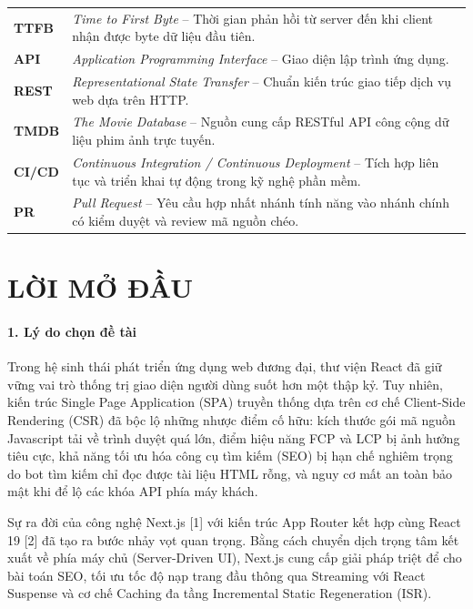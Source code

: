 \documentclass[13pt,a4paper]{extarticle}
\begin{document}
\begin{longtable}{>{\raggedright\arraybackslash}p{3cm}>{\raggedright\arraybackslash}p{12.5cm}}
\textbf{TTFB} & \textit{Time to First Byte} -- Thời gian phản hồi từ server đến khi client nhận được byte dữ liệu đầu tiên. \\
\textbf{API} & \textit{Application Programming Interface} -- Giao diện lập trình ứng dụng. \\
\textbf{REST} & \textit{Representational State Transfer} -- Chuẩn kiến trúc giao tiếp dịch vụ web dựa trên HTTP. \\
\textbf{TMDB} & \textit{The Movie Database} -- Nguồn cung cấp RESTful API công cộng dữ liệu phim ảnh trực tuyến. \\
\textbf{CI/CD} & \textit{Continuous Integration / Continuous Deployment} -- Tích hợp liên tục và triển khai tự động trong kỹ nghệ phần mềm. \\
\textbf{PR} & \textit{Pull Request} -- Yêu cầu hợp nhất nhánh tính năng vào nhánh chính có kiểm duyệt và review mã nguồn chéo. \\
\bottomrule
\end{longtable}

\newpage
\section*{LỜI MỞ ĐẦU}

\paragraph*{1. Lý do chọn đề tài}
Trong hệ sinh thái phát triển ứng dụng web đương đại, thư viện React đã giữ vững vai trò thống trị giao diện người dùng suốt hơn một thập kỷ. Tuy nhiên, kiến trúc Single Page Application (SPA) truyền thống dựa trên cơ chế Client-Side Rendering (CSR) đã bộc lộ những nhược điểm cố hữu: kích thước gói mã nguồn Javascript tải về trình duyệt quá lớn, điểm hiệu năng FCP và LCP bị ảnh hưởng tiêu cực, khả năng tối ưu hóa công cụ tìm kiếm (SEO) bị hạn chế nghiêm trọng do bot tìm kiếm chỉ đọc được tài liệu HTML rỗng, và nguy cơ mất an toàn bảo mật khi để lộ các khóa API phía máy khách.

Sự ra đời của công nghệ Next.js [1] với kiến trúc App Router kết hợp cùng React 19 [2] đã tạo ra bước nhảy vọt quan trọng. Bằng cách chuyển dịch trọng tâm kết xuất về phía máy chủ (Server-Driven UI), Next.js cung cấp giải pháp triệt để cho bài toán SEO, tối ưu tốc độ nạp trang đầu thông qua Streaming với React Suspense và cơ chế Caching đa tầng Incremental Static Regeneration (ISR).
\end{document}
